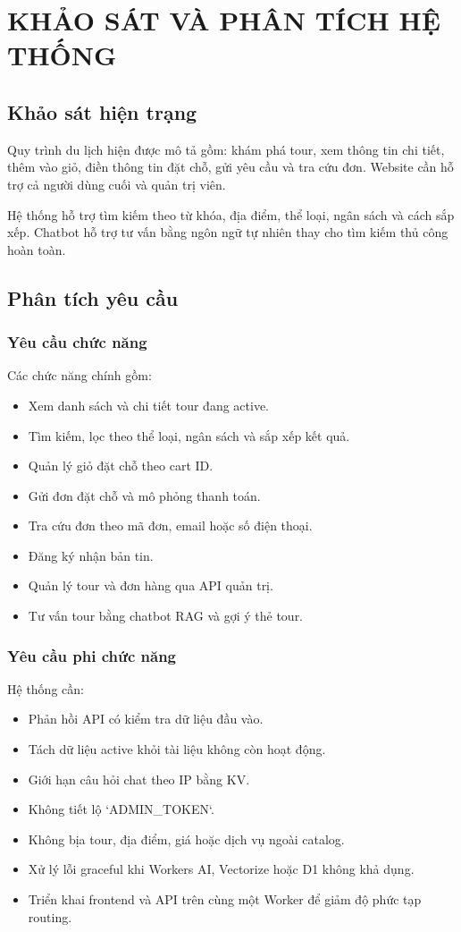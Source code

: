 \chapter{KHẢO SÁT VÀ PHÂN TÍCH HỆ THỐNG}

\section{Khảo sát hiện trạng}
Quy trình du lịch hiện được mô tả gồm: khám phá tour, xem thông tin chi tiết, thêm vào giỏ, điền thông tin đặt chỗ, gửi yêu cầu và tra cứu đơn. Website cần hỗ trợ cả người dùng cuối và quản trị viên.

Hệ thống hỗ trợ tìm kiếm theo từ khóa, địa điểm, thể loại, ngân sách và cách sắp xếp. Chatbot hỗ trợ tư vấn bằng ngôn ngữ tự nhiên thay cho tìm kiếm thủ công hoàn toàn.

\section{Phân tích yêu cầu}
\subsection{Yêu cầu chức năng}
Các chức năng chính gồm:
\begin{itemize}
    \item Xem danh sách và chi tiết tour đang active.
    \item Tìm kiếm, lọc theo thể loại, ngân sách và sắp xếp kết quả.
    \item Quản lý giỏ đặt chỗ theo cart ID.
    \item Gửi đơn đặt chỗ và mô phỏng thanh toán.
    \item Tra cứu đơn theo mã đơn, email hoặc số điện thoại.
    \item Đăng ký nhận bản tin.
    \item Quản lý tour và đơn hàng qua API quản trị.
    \item Tư vấn tour bằng chatbot RAG và gợi ý thẻ tour.
\end{itemize}

\subsection{Yêu cầu phi chức năng}
Hệ thống cần:
\begin{itemize}
    \item Phản hồi API có kiểm tra dữ liệu đầu vào.
    \item Tách dữ liệu active khỏi tài liệu không còn hoạt động.
    \item Giới hạn câu hỏi chat theo IP bằng KV.
    \item Không tiết lộ `ADMIN_TOKEN`.
    \item Không bịa tour, địa điểm, giá hoặc dịch vụ ngoài catalog.
    \item Xử lý lỗi graceful khi Workers AI, Vectorize hoặc D1 không khả dụng.
    \item Triển khai frontend và API trên cùng một Worker để giảm độ phức tạp routing.
\end{itemize}

